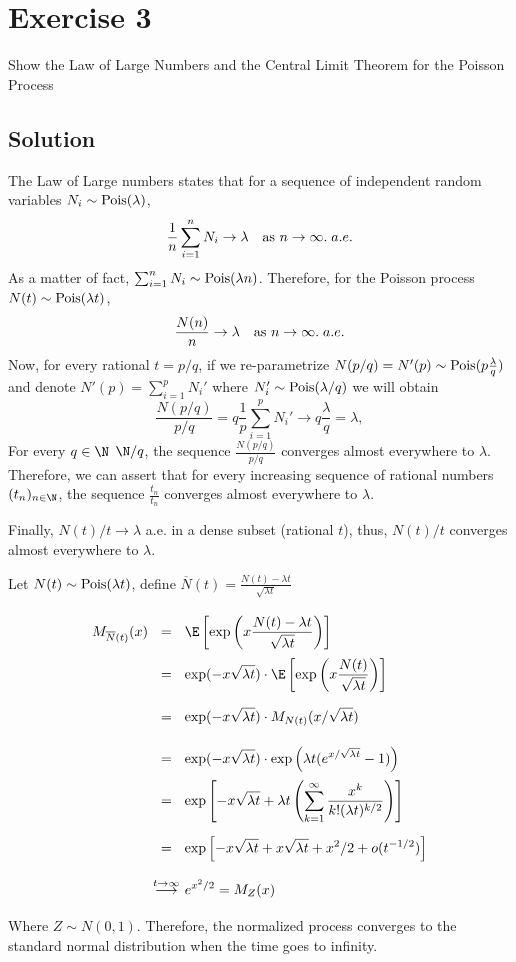 \section{Exercise 3}

Show the Law of Large Numbers and the Central Limit Theorem for the Poisson Process

\subsection*{Solution}

The Law of Large numbers states that for a sequence of independent random variables $N_i \sim \hbox{Pois}(\lambda)$,
\[ \frac{1}{n}\sum_{i = 1}^{n} N_i \to \lambda\hspace*{1em} \hbox{as }n\to\infty.\; a.e. \]
As a matter of fact, $\sum_{i = 1}^n N_i \sim \hbox{Pois}(\lambda n)$. Therefore, for the Poisson process $N(t) \sim \hbox{Pois}(\lambda t)$,
\[ \frac{N(n)}{n} \to \lambda\hspace*{1em} \hbox{as }n\to\infty.\; a.e. \]
Now, for every rational $t = p/q$, if we re-parametrize $N(p/q) = N'(p) \sim \hbox{Pois}(p \frac{\lambda}{q})$ and denote $N'(p) = \sum_{i = 1}^{p} N_i'$ where $N'_i \sim \hbox{Pois}(\lambda/q)$ we will obtain
\[ \frac{N(p/q)}{p/q} = q \frac{1}{p} \sum_{i = 1}^{p} N_i' \to q \frac{\lambda}{q} = \lambda, \]
For every $q\in \N$ $\N/q$, the sequence $\frac{N(p/q)}{p/q}$ converges almost everywhere to $\lambda$. Therefore, we can assert that for every increasing sequence of rational numbers $(t_n)_{n\in\N}$, the sequence $\frac{t_n}{t_n}$ converges almost everywhere to $\lambda$.

Finally, $N(t)/t \to \lambda$ a.e. in a dense subset (rational $t$), thus, $N(t)/t$ converges almost everywhere to $\lambda$. 

Let $N(t) \sim \hbox{Pois}(\lambda t)$, define $\overline{N}(t) = \frac{N(t) - \lambda t}{\sqrt{\lambda t}}$
\[ \everymath{\displaystyle}
\arraycolsep=1.8pt\def\arraystretch{2.5}
\begin{array}{rcl}
    M_{\overline{N}(t)}(x) & = & \E \left[ \exp \left( x \frac{N(t)-\lambda t}{\sqrt{\lambda t}} \right) \right]\\
    & = &  \exp(-x\sqrt{\lambda t}) \cdot \E \left[ \exp \left( x \frac{N(t)}{\sqrt{\lambda t}} \right) \right] \\
    & = & \exp(-x\sqrt{\lambda t}) \cdot M_{N(t)}(x/\sqrt{\lambda t})\\
    & = & \exp(-x\sqrt{\lambda t}) \cdot \exp\left( \lambda t (e^{x/\sqrt{\lambda t}}-1) \right)\\
    & = & \exp \left[ -x\sqrt{\lambda t} + \lambda t \left( \sum_{k = 1}^{\infty} \frac{x^k}{k!(\lambda t)^{k/2}} \right) \right]\\
    & = & \exp \left[ -x\sqrt{\lambda t} + x\sqrt{\lambda t} + x^2/2 + o(t^{-1/2})  \right]\\
    & \overset{t\to\infty}{\longrightarrow} & e^{x^2/2} = M_{Z}(x)
\end{array}  \]
Where $Z \sim N(0,1)$. Therefore, the normalized process converges to the standard normal distribution when the time goes to infinity.
